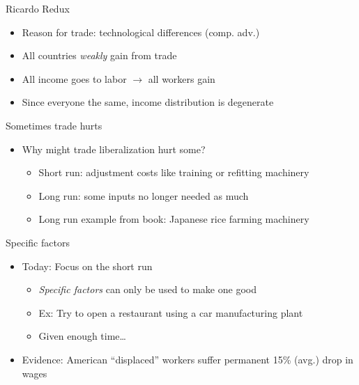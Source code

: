\documentclass[ignorenonframetext,]{beamer}
\begin{document}
\begin{frame}{Ricardo Redux}

    \begin{itemize}
        \item Reason for trade: technological differences (comp. adv.)
        \item All countries \emph{weakly} gain from trade
        \item All income goes to labor $\rightarrow$ all workers gain
        \item Since everyone the same, income distribution is degenerate
    \end{itemize}

\end{frame}

\begin{frame}{Sometimes trade hurts}

    \begin{itemize}
        \item Why might trade liberalization hurt some?
        \begin{itemize}
            \item Short run: adjustment costs like training or refitting machinery
            \item Long run: some inputs no longer needed as much
            \item Long run example from book: Japanese rice farming machinery 
        \end{itemize}
    \end{itemize}

\end{frame}

\begin{frame}{Specific factors}

    \begin{itemize}
        \item Today: Focus on the short run
        \begin{itemize}
            \item \emph{Specific factors} can only be used to make one good
            \item Ex: Try to open a restaurant using a car manufacturing plant
            \item Given enough time\dots
        \end{itemize}
        \item Evidence: American ``displaced'' workers suffer permanent 15\% (avg.) drop in wages 
    \end{itemize}

\end{frame}
\end{document}
